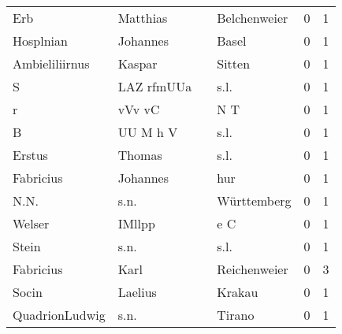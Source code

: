 \begin{center}
\begin{tiny}
\begin{longtabu}{llllrr}
                      Erb &                           Matthias &             &                                Belchenweier &          0 &         1 \\
                Hosplnian &                           Johannes &             &                                       Basel &          0 &         1 \\
           Ambieliliirnus &                             Kaspar &             &                                      Sitten &          0 &         1 \\
                        S &                         LAZ rfmUUa &             &                                        s.l. &          0 &         1 \\
                        r &                             vVv vC &             &                                         N T &          0 &         1 \\
                        B &                           UU M h V &             &                                        s.l. &          0 &         1 \\
                   Erstus &                             Thomas &             &                                        s.l. &          0 &         1 \\
                Fabricius &                           Johannes &             &                                         hur &          0 &         1 \\
                     N.N. &                               s.n. &             &                                 Württemberg &          0 &         1 \\
                   Welser &                             IMllpp &             &                                         e C &          0 &         1 \\
                    Stein &                               s.n. &             &                                        s.l. &          0 &         1 \\
                Fabricius &                               Karl &             &                                Reichenweier &          0 &         3 \\
                    Socin &                            Laelius &             &                                      Krakau &          0 &         1 \\
           QuadrionLudwig &                               s.n. &             &                                      Tirano &          0 &         1 \\

\end{longtabu}
\end{tiny}
\end{center}
